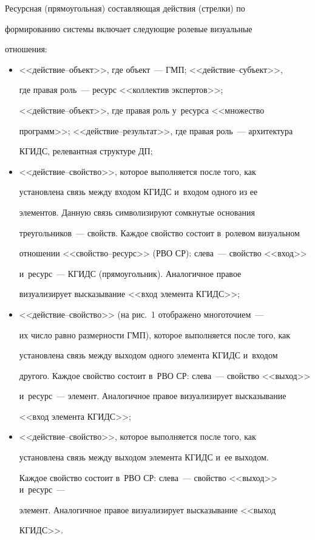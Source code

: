  

  Ресурсная (прямоугольная) со\-став\-ля\-ющая действия (стрел\-ки) по 

формированию сис\-те\-мы вклю\-ча\-ет сле\-ду\-ющие ролевые визуальные 

отношения: 



\pagebreak



\noindent

  \begin{itemize}

\item <<действие--объект>>, где объект~--- ГМП; <<дей\-ст\-вие--субъ\-ект>>, 

где правая роль~--- ресурс <<коллектив экспертов>>;  

<<дей\-ст\-вие--объ\-ект>>, где правая роль у~ресурса <<множество 

программ>>; <<дей\-ст\-вие--ре\-зуль\-тат>>, где правая роль~--- архитектура 

КГИДС, релевантная структуре ДП;

\item <<действие--свой\-ст\-во>>, которое выполняется после того, как 

установлена связь между входом \mbox{КГИДС} и~входом одного из ее 

элементов. Данную связь символизируют сомкнутые основания 

треугольников~--- свойств. Каждое свойство со\-сто\-ит в~ролевом визуальном 

отношении <<свой\-ст\-во--ре\-сурс>> (РВО СР): слева~--- свойство <<вход>>  

и~ресурс~--- \mbox{КГИДС} (прямоугольник). Аналогичное правое 

визуализирует вы\-ска\-зы\-ва\-ние <<вход элемента \mbox{КГИДС}>>;

\item <<действие--свой\-ст\-во>> (на рис.~1 отоб\-ра\-же\-но многоточием~--- 

их чис\-ло рав\-но раз\-мер\-ности ГМП), которое выполняется после того, как 

установлена связь между выходом одного элемента \mbox{КГИДС} и~входом 

другого. Каждое свойство состоит в~РВО СР: слева~--- свойство <<выход>> 

и~ресурс~--- элемент. Аналогичное правое визуализирует высказывание 

<<вход элемента \mbox{КГИДС}>>;

\item <<действие--свой\-ст\-во>>, которое выполняется после того, как 

установлена связь между выходом элемента \mbox{КГИДС} и~ее выходом. 

Каждое свойство состоит в~РВО СР: слева~--- свойство <<выход>> и~ресурс~--- 

элемент. Аналогичное правое визуализирует высказывание <<выход 

\mbox{КГИДС}>>.

\end{itemize}



